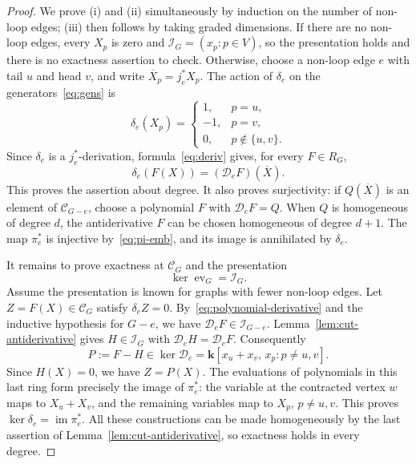 \documentclass[reqno]{article}
\theoremstyle{plain} %
\theoremstyle{definition}
\theoremstyle{remark}
\newcommand{\K} {\mathbf{k}}
\newcommand {\CC}{\mathscr{C}}
\numberwithin{equation}{section}
\begin{document}
\begin{proof}
We prove (i) and (ii) simultaneously by induction on the number of
non-loop edges; (iii) then follows by taking graded dimensions.
If there are no non-loop edges, every $X_p$ is zero and
$\mathcal I_G=(x_p:p\in V)$, so the presentation holds and there is
no exactness assertion to check. Otherwise, choose a non-loop edge
$e$ with tail $u$ and head $v$, and write $\overline X_p=j_e^*X_p$.
The action of $\delta_e$ on the generators~\eqref{eq:gens} is
\begin{equation}\label{eq:deriv}
\delta_e(X_p)=
\begin{cases}
  1,&p=u,\\
 -1,&p=v,\\
  0,&p\notin\{u,v\}.
\end{cases}
\end{equation}
Since $\delta_e$ is a $j_e^*$-derivation, formula~\eqref{eq:deriv} gives,
for every $F\in R_G$,
\begin{equation}\label{eq:polynomial-derivative}
\delta_e(F(X))=(\mathcal D_eF)(\overline X).
\end{equation}
This proves the assertion about degree. It also proves surjectivity: if $Q(\overline X)$ is an
element of $\CC_{G-e}$, choose a polynomial $F$ with
$\mathcal D_eF=Q$.  When $Q$ is homogeneous of degree $d$, the
antiderivative $F$ can be chosen homogeneous of degree $d+1$.
The map $\pi_e^*$ is injective by~\eqref{eq:pi-emb}, and its image is
annihilated by $\delta_e$.

It remains to prove exactness at $\CC_G$ and the presentation
\begin{equation}\label{eq:graded-presentation-kernel}
\ker\operatorname{ev}_G=\mathcal I_G.
\end{equation}
Assume the presentation is known for graphs with fewer non-loop edges.
Let $Z=F(X)\in\CC_G$ satisfy $\delta_eZ=0$.
By~\eqref{eq:polynomial-derivative} and the inductive hypothesis for
$G-e$, we have $\mathcal D_eF\in\mathcal I_{G-e}$.
Lemma~\ref{lem:cut-antiderivative} gives $H\in\mathcal I_G$ with
$\mathcal D_eH=\mathcal D_eF$.  Consequently
\[
P:=F-H\in\ker\mathcal D_e
 =\K[x_u+x_v,\,x_p:p\ne u,v].
\]
Since $H(X)=0$, we have $Z=P(X)$.  The evaluations of polynomials in
this last ring form precisely the image of $\pi_e^*$: the variable at
the contracted vertex $w$ maps to $X_u+X_v$, and the remaining variables
map to $X_p$, $p\ne u,v$.  This proves
$\ker\delta_e=\operatorname{im}\pi_e^*$.
All these constructions can be made homogeneously by the last assertion
of Lemma~\ref{lem:cut-antiderivative}, so exactness holds in every degree.


\end{proof}
\end{document}
